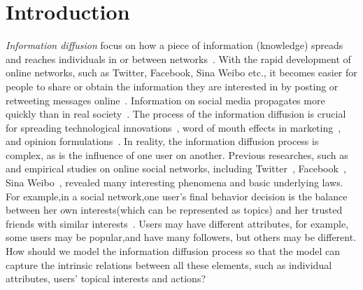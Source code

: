 \documentclass[runningheads,a4paper]{llncs}
\begin{document}
\section{Introduction}

\emph{Information diffusion} focus on how a piece of information (knowledge) spreads and reaches individuals in or between networks~\cite{yang2015rain,xiong2012information}.
With the rapid development of online networks, such as Twitter, Facebook, Sina Weibo etc., it becomes easier for people to share or obtain the information they are interested in by posting or retweeting messages online~\cite{Abel2011Analyzing,Aslay2014Online,Yang2010Predicting}. Information on social media propagates more quickly than in real society~\cite{Gomez2012Inferring,Kwak2010What}. The process of the information diffusion is crucial for spreading technological innovations~\cite{tu2015prism}, word of mouth effects in marketing~\cite{Domingos2001Mining}, and opinion formulations~\cite{xu2012modeling}. In reality, the information diffusion process is complex, as is the influence of one user on another. Previous researches, such as \cite{Zhang2014Role,Chen2015Online,Tang2009Social} and empirical studies on online social networks, including Twitter~\cite{Grabowicz2016Distinguishing,Kwak2010What}, Facebook~\cite{Sekara2015Fundamental}, Sina Weibo~\cite{tu2015prism}, revealed many interesting phenomena and basic underlying laws. For example,in a social network,one user's final behavior decision is the balance between her own interests(which can be represented as topics) and her trusted friends with similar interests~\cite{Barbieri2012Topic,xu2012modeling,Zhang2014Role}. Users may have different attributes, for example, some users may be popular,and have many followers, but others may be different. How should we model the information diffusion process so that the model can capture the intrinsic relations between all these elements, such as individual attributes, users' topical interests and actions?
\end{document}
